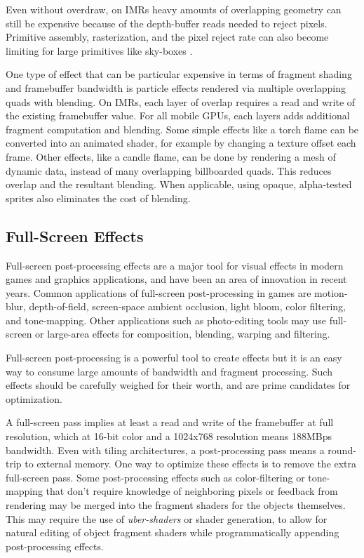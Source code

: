 Even without overdraw, on IMRs heavy amounts of overlapping geometry can still be
expensive because of the depth-buffer reads needed to reject pixels.  Primitive
assembly, rasterization, and the pixel reject rate can also become limiting for
large primitives like sky-boxes \cite{Pranckevicius11a}.

One type of effect that can be particular expensive in terms of fragment
shading and framebuffer bandwidth is particle effects rendered via multiple
overlapping quads with blending.  On IMRs, each layer of overlap requires a
read and
 write of the existing framebuffer value.  For all mobile GPUs, each
layers adds additional fragment computation
 and blending.  Some simple
effects
 like a torch flame can be converted into an animated shader, for
example by
 changing a texture offset each frame.  Other effects, like a
candle flame, can
 be done by rendering a mesh of dynamic data, instead of
many overlapping billboarded quads.  This
 reduces overlap and the resultant
blending.  When applicable, using opaque, alpha-tested sprites also eliminates
the cost of blending.

\subsection {Full-Screen Effects}\label{Jon-McCaffrey-Full-Screen-Effects}
Full-screen post-processing effects are a major tool for visual effects in
modern games and graphics applications, and have been an area of innovation in
recent years.   Common applications of full-screen post-processing in games are
motion-blur, depth-of-field, screen-space ambient occlusion, light bloom, color
filtering, and tone-mapping.  Other applications such as photo-editing tools
may use full-screen or large-area effects for composition, blending, warping
and filtering.

Full-screen post-processing is a powerful tool to create effects but it is an
easy way to consume large amounts of bandwidth and fragment processing.  Such
effects should be carefully weighed for their worth, and are prime candidates
for optimization.  

A full-screen pass implies at least a read and write of the framebuffer at full
resolution, which at 16-bit color and a 1024x768 resolution means 188MBps
bandwidth.  Even with tiling architectures, a post-processing pass
means a round-trip to external memory.  One way to optimize these effects is to
remove the extra full-screen pass.  Some post-processing effects such as
color-filtering or tone-mapping that don't require knowledge of neighboring
pixels or feedback from rendering may be merged into the fragment shaders for
the objects themselves.  This may require the use of \textit{uber-shaders} or
shader generation, to allow for natural editing of object fragment shaders
while programmatically appending post-processing effects.

